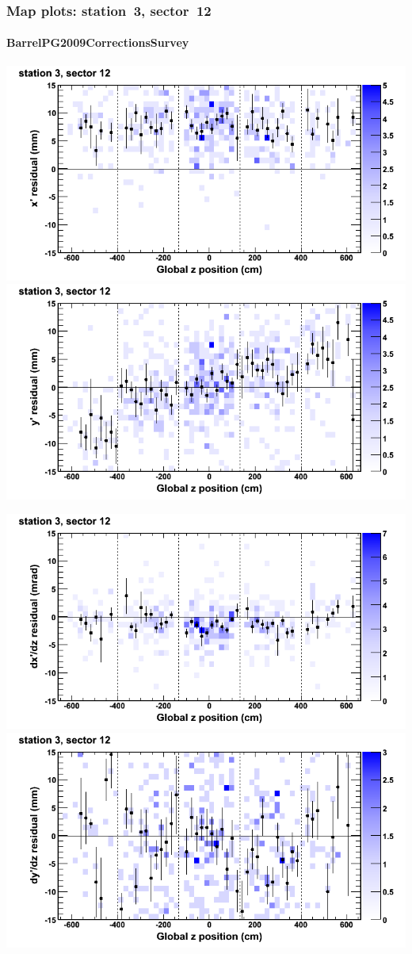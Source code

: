\documentclass[compress]{beamer}
\begin{document}
\begin{frame}
\frametitle{Map plots: station~3, sector~12}
\framesubtitle{BarrelPG2009CorrectionsSurvey}
\includegraphics[width=0.5\linewidth]{mapplots_01/DTvsz_st3sec12_x.png}
\includegraphics[width=0.5\linewidth]{mapplots_01/DTvsz_st3sec12_y.png}

\includegraphics[width=0.5\linewidth]{mapplots_01/DTvsz_st3sec12_dxdz.png}
\includegraphics[width=0.5\linewidth]{mapplots_01/DTvsz_st3sec12_dydz.png}
\end{frame}
\end{document}
